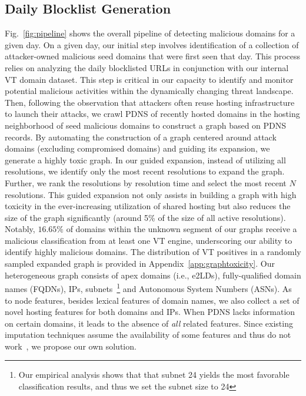 \subsection{Daily Blocklist Generation}
\label{subsec:dailyblocklistgeneration}

Fig.~\ref{fig:pipeline} shows the overall pipeline of detecting malicious domains for a given day. 
On a given day, our initial step involves identification of a collection of attacker-owned malicious seed domains that were first seen that day. This process relies on analyzing the daily blocklisted URLs in conjunction with our internal VT domain dataset. This step is critical in our capacity to identify and monitor potential malicious activities within the dynamically changing threat landscape.
Then, following the observation that attackers often reuse hosting infrastructure to launch their attacks, we crawl PDNS of recently hosted domains in the hosting neighborhood of seed malicious domains to construct a graph based on PDNS records. 
By automating the construction of a graph centered around attack domains (excluding compromised domains) and guiding its expansion, we generate a highly toxic graph. In our guided expansion, instead of utilizing all resolutions, we identify only the most recent resolutions to expand the graph. Further, we rank the resolutions by resolution time and select the most recent $N$ resolutions. This guided expansion not only assists in building a graph with high toxicity in the ever-increasing utilization of shared hosting but also reduces the size of the graph significantly (around 5\% of the size of all active resolutions). 
Notably, $16.65\%$ of domains within the unknown segment of our graphs receive a malicious classification from at least one VT engine, underscoring our ability to identify highly malicious domains. The distribution of VT positives in a randomly sampled expanded graph is provided in Appendix~\ref{app:graphtoxicity}.
Our heterogeneous graph consists of apex domains (i.e., e2LDs), fully-qualified domain names (FQDNs), IPs, subnets~\footnote{Our empirical analysis shows that that subnet 24 yields the most favorable classification results, and thus we set the subnet size to 24} and Autonomous System Numbers (ASNs). As to node features, besides lexical features of domain names, we also collect a set of novel hosting features for both domains and IPs. When PDNS lacks information on certain domains, it leads to the absence of \textit{all} related features. Since existing imputation techniques assume the availability of some features and thus do not work~\cite{grape2020}, we propose our own solution. 

